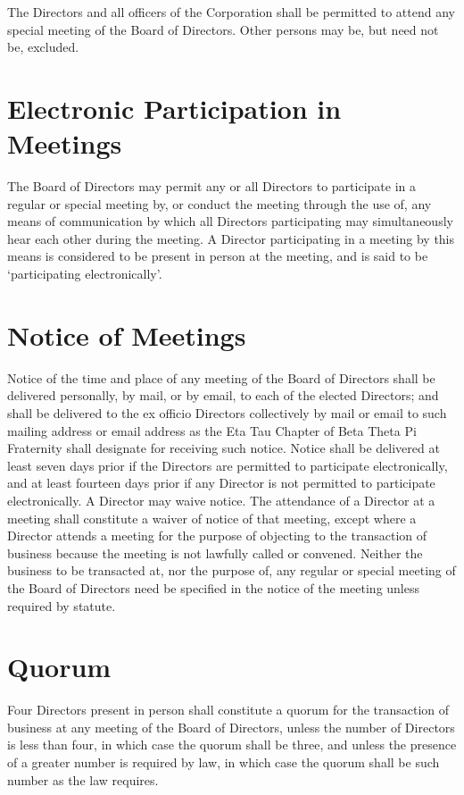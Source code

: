 The Directors and all officers of the Corporation shall be permitted to attend
any special meeting of the Board of Directors.  Other persons may be, but need
not be, excluded.

\section{Electronic Participation in Meetings}

The Board of Directors may permit any or all Directors to participate in a
regular or special meeting by, or conduct the meeting through the use of, any
means of communication by which all Directors participating may simultaneously
hear each other during the meeting. A Director participating in a meeting by
this means is considered to be present in person at the meeting, and is said to
be `participating electronically'.


\section{Notice of Meetings}

Notice of the time and place of any meeting of the Board of Directors shall be
delivered personally, by mail, or by email, to each of the elected Directors;
and shall be delivered to the ex officio Directors collectively by mail or email
to such mailing address or email address as the Eta Tau Chapter of Beta Theta Pi
Fraternity shall designate for receiving such notice.  Notice shall be delivered
at least seven days prior if the Directors are permitted to participate
electronically, and at least fourteen days prior if any Director is not
permitted to participate electronically.  A Director may waive notice.  The
attendance of a Director at a meeting shall constitute a waiver of notice of
that meeting, except where a Director attends a meeting for the purpose of
objecting to the transaction of business because the meeting is not lawfully
called or convened.  Neither the business to be transacted at, nor the purpose
of, any regular or special meeting of the Board of Directors need be specified
in the notice of the meeting unless required by statute.

\section{Quorum}

Four Directors present in person shall constitute a quorum for the transaction
of business at any meeting of the Board of Directors, unless the number of
Directors is less than four, in which case the quorum shall be three, and unless
the presence of a greater number is required by law, in which case the quorum
shall be such number as the law requires.

